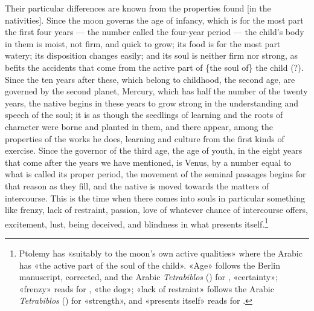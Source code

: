 \documentclass[11pt]{article}
\newcommand{\Fol}[1]{\marginpar{\footnotesize\color{gray}f.\,#1}}
\begin{document}
\par \Fol{76r}Their particular differences are known from the properties found [in the nativities]. Since the moon governs the age of infancy, which is for the most part the first four years — the number called the four-year period — the child's body in them is moist, not firm, and quick to grow; its food is for the most part watery; its disposition changes easily; and its soul is neither firm nor strong, as befits the accidents that come from the active part of \{the soul of\} the child (?). Since the ten years after these, which belong to childhood, the second age, are governed by the second planet, Mercury, which has half the number of the twenty years, the native begins in these years to grow strong in the understanding and speech of the soul; it is as though the seedlings of learning and the roots of character were borne and planted in them, and there appear, among the properties of the works he does, learning and culture from the first kinds of exercise. Since the governor of the third age, the age of youth, in the eight years that come after the years we have mentioned, is Venus, by a number equal to what is called its proper period, the movement of the seminal passages begins for that reason as they fill, and the native is moved towards the matters of intercourse. This is the time when there comes into souls in particular something like frenzy, lack of restraint, passion, love of whatever chance of intercourse offers, excitement, lust, being deceived, and blindness in what presents itself.\footnote{Ptolemy has «suitably to the moon's own active qualities» where the Arabic has «the active part of the soul of the child». «Age» follows the Berlin manuscript, corrected, and the Arabic \emph{Tetrabiblos} () for , «certainty»; «frenzy» reads  for , «the dog»; «lack of restraint» follows the Arabic \emph{Tetrabiblos} () for «strength», and «presents itself» reads  for .}\par
\end{document}
